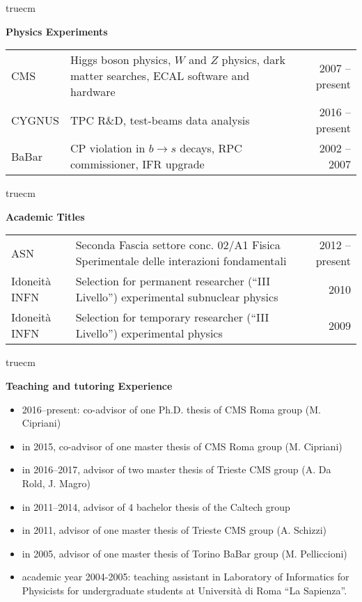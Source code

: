 \documentclass[11pt,twoside,a4paper]{article}
\begin{document}
 truecm


\begin{center}
{\bf{Physics Experiments}}
\end{center}
\begin{tabular}{lp{11cm}r}
CMS & Higgs boson physics, $W$ and $Z$ physics, dark matter searches, \newline ECAL software and hardware & 2007 -- present \\
CYGNUS & TPC R\&D, test-beams data analysis &  2016 -- present \\
BaBar & CP violation in $b \to s$ decays, RPC commissioner, IFR upgrade & 2002 -- 2007 \\
\end{tabular}

 truecm

\begin{center}
{\bf{Academic Titles}}
\end{center}
\begin{tabular}{lp{9cm}r}
ASN & Seconda Fascia
settore conc. 02/A1 \newline Fisica Sperimentale delle interazioni fondamentali & 2012 -- present \\
Idoneit\`a INFN & Selection for permanent researcher (``III Livello'') \newline experimental subnuclear physics & 2010 \\
Idoneit\`a INFN & Selection for temporary researcher (``III Livello'') \newline experimental physics & 2009 \\
\end{tabular}

 truecm

\begin{center}
{ \bf Teaching and tutoring Experience }
\end{center}
 \begin{itemize}  
 \item 2016--present: co-advisor of one Ph.D. thesis of CMS Roma group (M. Cipriani)
 \item in 2015, co-advisor of one master thesis of CMS Roma group (M. Cipriani)
 \item in 2016--2017, advisor of two master thesis of Trieste CMS group (A. Da Rold, J. Magro)
 \item in 2011--2014, advisor of 4 bachelor thesis of the Caltech group
 \item in 2011, advisor of one master thesis of Trieste CMS group (A. Schizzi)
 \item in 2005, advisor of one master thesis of Torino BaBar group (M. Pelliccioni)
 \item academic year 2004-2005: teaching assistant in Laboratory
   of Informatics for Physicists for undergraduate students at
   Universit\`a di Roma ``La Sapienza''.
\end{itemize}
\end{document}
